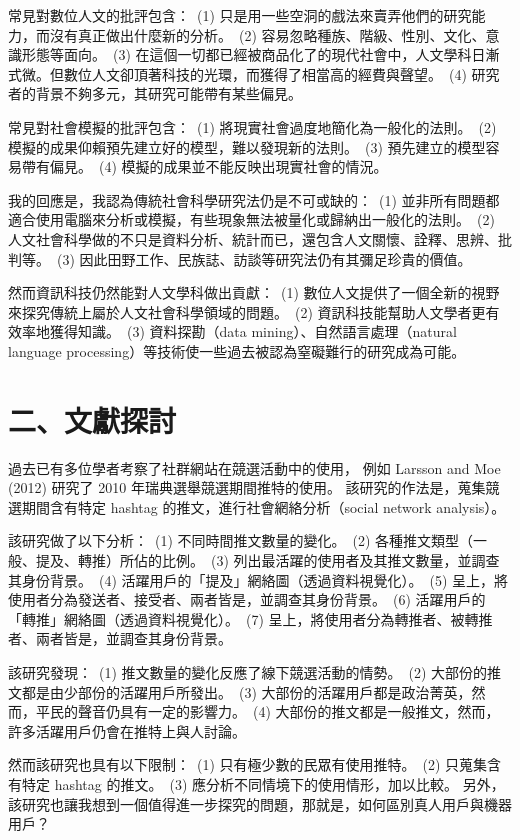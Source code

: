 \documentclass[a4paper, 10pt, conference]{ieeeconf}       %
\begin{document}
\begin{CJK}{UTF8}{bsmi}
常見對數位人文的批評包含：%
\,(1) 只是用一些空洞的戲法來賣弄他們的研究能力，而沒有真正做出什麼新的分析。%
\,(2) 容易忽略種族、階級、性別、文化、意識形態等面向。%
\,(3) 在這個一切都已經被商品化了的現代社會中，人文學科日漸式微。但數位人文卻頂著科技的光環，而獲得了相當高的經費與聲望。%
\,(4) 研究者的背景不夠多元，其研究可能帶有某些偏見。%

常見對社會模擬的批評包含：%
\,(1) 將現實社會過度地簡化為一般化的法則。%
\,(2) 模擬的成果仰賴預先建立好的模型，難以發現新的法則。%
\,(3) 預先建立的模型容易帶有偏見。%
\,(4) 模擬的成果並不能反映出現實社會的情況。%

我的回應是，我認為傳統社會科學研究法仍是不可或缺的：%
\,(1) 並非所有問題都適合使用電腦來分析或模擬，有些現象無法被量化或歸納出一般化的法則。%
\,(2) 人文社會科學做的不只是資料分析、統計而已，還包含人文關懷、詮釋、思辨、批判等。%
\,(3) 因此田野工作、民族誌、訪談等研究法仍有其彌足珍貴的價值。%

然而資訊科技仍然能對人文學科做出貢獻：%
\,(1) 數位人文提供了一個全新的視野來探究傳統上屬於人文社會科學領域的問題。%
\,(2) 資訊科技能幫助人文學者更有效率地獲得知識。%
\,(3) 資料探勘（data mining）、自然語言處理（natural language processing）等技術使一些過去被認為窒礙難行的研究成為可能。%

\section*{二、文獻探討}

過去已有多位學者考察了社群網站在競選活動中的使用，%
例如 Larsson and Moe (2012) 研究了 2010 年瑞典選舉競選期間推特的使用。\cite{c1} %
該研究的作法是，蒐集競選期間含有特定 hashtag 的推文，進行社會網絡分析（social network analysis）。%

該研究做了以下分析：%
\,(1) 不同時間推文數量的變化。%
\,(2) 各種推文類型（一般、提及、轉推）所佔的比例。%
\,(3) 列出最活躍的使用者及其推文數量，並調查其身份背景。%
\,(4) 活躍用戶的「提及」網絡圖（透過資料視覺化）。%
\,(5) 呈上，將使用者分為發送者、接受者、兩者皆是，並調查其身份背景。%
\,(6) 活躍用戶的「轉推」網絡圖（透過資料視覺化）。%
\,(7) 呈上，將使用者分為轉推者、被轉推者、兩者皆是，並調查其身份背景。%

該研究發現：%
\,(1) 推文數量的變化反應了線下競選活動的情勢。%
\,(2) 大部份的推文都是由少部份的活躍用戶所發出。%
\,(3) 大部份的活躍用戶都是政治菁英，然而，平民的聲音仍具有一定的影響力。%
\,(4) 大部份的推文都是一般推文，然而，許多活躍用戶仍會在推特上與人討論。%

然而該研究也具有以下限制：%
\,(1) 只有極少數的民眾有使用推特。%
\,(2) 只蒐集含有特定 hashtag 的推文。%
\,(3) 應分析不同情境下的使用情形，加以比較。%
另外，該研究也讓我想到一個值得進一步探究的問題，那就是，如何區別真人用戶與機器用戶？%


\end{CJK}
\end{document}
